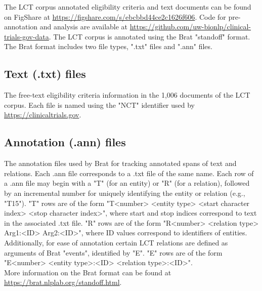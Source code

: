 \documentclass[../main.tex]{subfiles}
\begin{document}
The LCT corpus annotated eligibility criteria and text documents can be found on FigShare at \url{https://figshare.com/s/ebcbbd44ce2c1626f606}. Code for pre-annotation and analysis are available at \url{https://github.com/uw-bionlp/clinical-trials-gov-data}. The LCT corpus is annotated using the Brat "standoff" format. The Brat format includes two file types, ".txt" files and ".ann" files. \\

\subsection*{Text (.txt) files}
The free-text eligibility criteria information in the 1,006 documents of the LCT corpus. Each file is named using the "NCT" identifier used by \url{https://clinicaltrials.gov}. \\

\subsection*{Annotation (.ann) files}
The annotation files used by Brat for tracking annotated spans of text and relations. Each .ann file corresponds to a .txt file of the same name. Each row of a .ann file may begin with a "T" (for an entity) or "R" (for a relation), followed by an incremental number for uniquely identifying the entity or relation (e.g., "T15"). "T" rows are of the form "T<number> <entity type> <start character index> <stop character index>", where start and stop indices correspond to text in the associated .txt file. "R" rows are of the form "R<number> <relation type> Arg1:<ID> Arg2:<ID>", where ID values correspond to identifiers of entities. Additionally, for ease of annotation certain LCT relations are defined as arguments of Brat "events", identified by "E". "E" rows are of the form "E<number> <entity type>:<ID> <relation type>:<ID>". \\

\noindent More information on the Brat format can be found at \url{https://brat.nlplab.org/standoff.html}. \\
\end{document}
